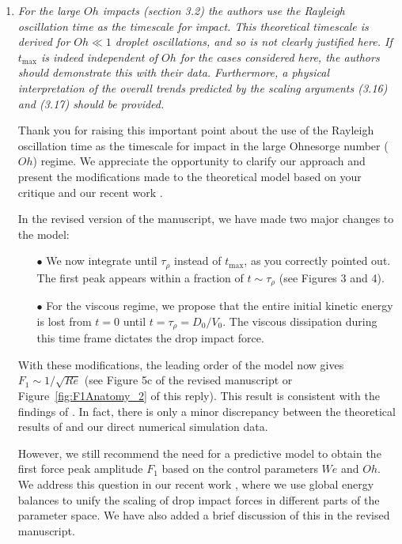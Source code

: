 \documentclass[]{article}
\begin{document}
\begin{enumerate}
	\item \textit{For the large $Oh$ impacts (section 3.2) the authors use the Rayleigh oscillation time as the timescale for impact. This theoretical timescale is derived for $Oh \ll 1$ droplet oscillations, and so is not clearly justified here. If $t_{\text{max}}$ is indeed independent of $Oh$ for the cases considered here, the authors should demonstrate this with their data. Furthermore, a physical interpretation of the overall trends predicted by the scaling arguments (3.16) and (3.17) should be provided.}
	
	Thank you for raising this important point about the use of the Rayleigh oscillation time as the timescale for impact in the large Ohnesorge number ($Oh$) regime. We appreciate the opportunity to clarify our approach and present the modifications made to the theoretical model based on your critique and our recent work \citep{sanjay2024PRL}.
	
	In the revised version of the manuscript, we have made two major changes to the model:
	
	\begin{enumerate}
		\item[$\bullet$] We now integrate until $\tau_\rho$ instead of $t_{\text{max}}$, as you correctly pointed out. The first peak appears within a fraction of $t \sim \tau_\rho$ (see Figures 3 and 4).
		\item[$\bullet$] For the viscous regime, we propose that the entire initial kinetic energy is lost from $t = 0$ until $t = \tau_\rho = D_0/V_0$. The viscous dissipation during this time frame dictates the drop impact force.
	\end{enumerate}
	
	With these modifications, the leading order of the model now gives $F_1 \sim 1/\sqrt{Re}$ (see Figure 5c of the revised manuscript or Figure~\ref{fig:F1Anatomy_2} of this reply). This result is consistent with the findings of \citet{Gordillo2018}. In fact, there is only a minor discrepancy between the theoretical results of \citet{Gordillo2018, cheng2021drop} and our direct numerical simulation data.
	
	However, we still recommend the need for a predictive model to obtain the first force peak amplitude $F_1$ based on the control parameters $We$ and $Oh$. We address this question in our recent work \citep{sanjay2024PRL}, where we use global energy balances to unify the scaling of drop impact forces in different parts of the parameter space. We have also added a brief discussion of this in the revised manuscript.
	

\end{enumerate}
\end{document}
